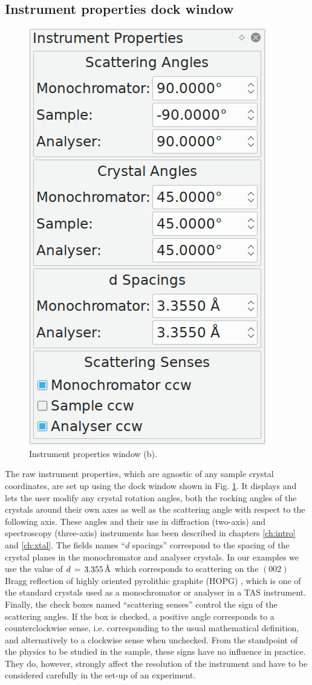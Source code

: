 \subsection{Instrument properties dock window}
\begin{minipage}{1 \textwidth}
\setlength{\intextsep}{0.25cm}
\begin{figure}
	\vspace{-0.25cm}
	\includegraphics[width = 0.25 \textwidth]{figures/gui_instrument}
	\caption[Instrument properties window.]{Instrument properties window (b).
		\label{fig:gui_instr}}
\end{figure}

The raw instrument properties, which are agnostic of any sample crystal coordinates, are set up
using the dock window shown in Fig. \ref{fig:gui_instr}. It displays and lets the user modify
any crystal rotation angles, both the rocking angles of the crystals around their own axes
as well as the scattering angle with respect to the following axis. These angles and their
use in diffraction (two-axis) and spectroscopy (three-axis) instruments has been described 
in chapters \ref{ch:intro} and \ref{ch:xtal}. 
The fields names ``$d$ spacings'' correspond to the spacing of the crystal planes in the 
monochromator and analyser crystals. In our examples we use the value of $d\,=\,3.355\, \textup{\AA}$
which corresponds to scattering on the $\left(002\right)$ Bragg reflection of highly oriented
pyrolithic graphite (HOPG) \cite[p. 250]{Shirane2002}, which is one of the standard crystals used as a
monochromator or analyser in a TAS instrument.
Finally, the check boxes named ``scattering senses'' control the sign of the scattering angles.
If the box is checked, a positive angle corresponds to a counterclockwise sense, i.e. corresponding
to the usual mathematical definition, and alternatively to a clockwise sense when unchecked.
From the standpoint of the physics to be studied in the sample, these signs have no influence
in practice. They do, however, strongly affect the resolution of the instrument \cite{Eckold2014}
and have to be considered carefully in the set-up of an experiment.
\end{minipage}



